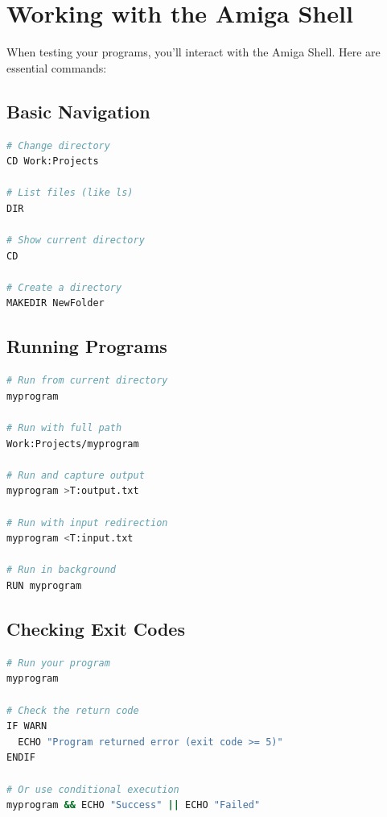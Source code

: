 \section{Working with the Amiga Shell}
\label{sec:amiga-shell}

When testing your programs, you'll interact with the Amiga Shell. Here are essential commands:

\subsection{Basic Navigation}

\begin{lstlisting}[language=bash]
# Change directory
CD Work:Projects

# List files (like ls)
DIR

# Show current directory
CD

# Create a directory
MAKEDIR NewFolder
\end{lstlisting}

\subsection{Running Programs}

\begin{lstlisting}[language=bash]
# Run from current directory
myprogram

# Run with full path
Work:Projects/myprogram

# Run and capture output
myprogram >T:output.txt

# Run with input redirection
myprogram <T:input.txt

# Run in background
RUN myprogram
\end{lstlisting}

\subsection{Checking Exit Codes}

\begin{lstlisting}[language=bash]
# Run your program
myprogram

# Check the return code
IF WARN
  ECHO "Program returned error (exit code >= 5)"
ENDIF

# Or use conditional execution
myprogram && ECHO "Success" || ECHO "Failed"
\end{lstlisting}


